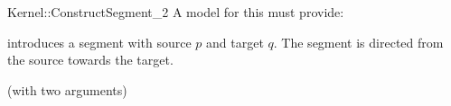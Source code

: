 \begin{ccRefFunctionObjectConcept}{Kernel::ConstructSegment_2}
A model for this must provide:


            {introduces a segment  with source $p$
             and target $q$. The segment is directed from the source towards
             the target.}

\ccRefines
{} (with two arguments)

\ccSeeAlso
{}\\

\end{ccRefFunctionObjectConcept}
